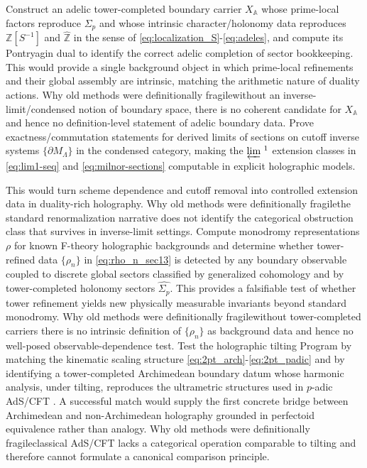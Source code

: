 \documentclass[11pt]{article}
\theoremstyle{remark}
\newcommand{\Z}{\mathbb{Z}}
\newcommand{\A}{\mathbb{A}}
\begin{document}
Construct an adelic tower-completed boundary carrier \(X_{\A}\) whose prime-local factors reproduce \(\Sigma_{p}\) and whose intrinsic character/holonomy data reproduces \(\Z[S^{-1}]\) and \(\widehat{\Z}\) in the sense of \eqref{eq:localization_S}-\eqref{eq:adeles}, and compute its Pontryagin dual to identify the correct adelic completion of sector bookkeeping. This would provide a single background object in which prime-local refinements and their global assembly are intrinsic, matching the arithmetic nature of duality actions. Why old methods were definitionally fragile\:without an inverse-limit/condensed notion of boundary space, there is no coherent candidate for \(X_{\A}\) and hence no definition-level statement of adelic boundary data. Prove exactness/commutation statements for derived limits of sections on cutoff inverse systems \(\{\partial M_{\Lambda}\}\) in the condensed category, making the \(\varprojlim{}^{\,1}\) extension classes in \eqref{eq:lim1-seq} and \eqref{eq:milnor-sections} computable in explicit holographic models.

This would turn scheme dependence and cutoff removal into controlled extension data in duality-rich holography. Why old methods were definitionally fragile\:the standard renormalization narrative does not identify the categorical obstruction class that survives in inverse-limit settings. Compute monodromy representations \(\rho\) for known F-theory holographic backgrounds and determine whether tower-refined data \(\{\rho_{n}\}\) in \eqref{eq:rho_n_sec13} is detected by any boundary observable coupled to discrete global sectors classified by generalized cohomology and by tower-completed holonomy sectors \(\widehat{\Sigma_{p}}\). This provides a falsifiable test of whether tower refinement yields new physically measurable invariants beyond standard monodromy. Why old methods were definitionally fragile\:without tower-completed carriers there is no intrinsic definition of \(\{\rho_n\}\) as background data and hence no well-posed observable-dependence test. Test the holographic tilting Program by matching the kinematic scaling structure \eqref{eq:2pt_arch}-\eqref{eq:2pt_padic} and by identifying a tower-completed Archimedean boundary datum whose harmonic analysis, under tilting, reproduces the ultrametric structures used in \(p\)-adic AdS/CFT \cite{Gubser2017, Heydeman2018}. A successful match would supply the first concrete bridge between Archimedean and non-Archimedean holography grounded in perfectoid equivalence rather than analogy. Why old methods were definitionally fragile\:classical AdS/CFT lacks a categorical operation comparable to tilting and therefore cannot formulate a canonical comparison principle.
\end{document}
